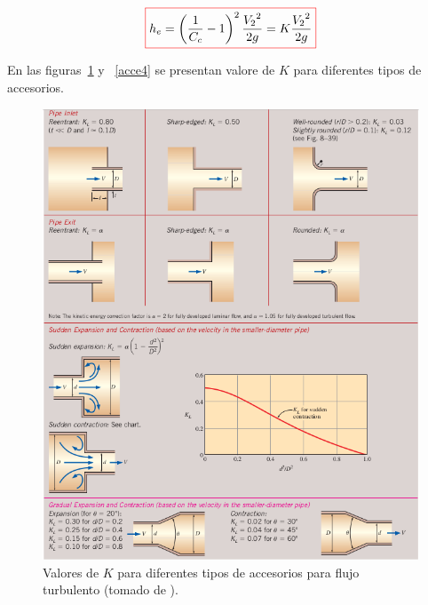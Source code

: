 \documentclass[11pt, oneside]{article}
\begin{document}
\begin{equation}
\color{red}\boxed{\color{black} h_e = \left( \frac{1}{C_c} -1 \right)^2 \frac{{V_2}^2}{2g} = K  \frac{{V_2}^2}{2g} }
\label{perm10}
\end{equation}

En las figuras~\ref{acce3} y ~\ref{acce4} se presentan valore de $K$ para diferentes tipos de accesorios. 

\begin{figure}[h]
\centering
\includegraphics[width=\textwidth]{acce3.png}
\caption{Valores de $K$ para diferentes tipos de accesorios para flujo turbulento (tomado de \cite{cengel2013ebook}).}
\label{acce3}
\end{figure}
\end{document}
